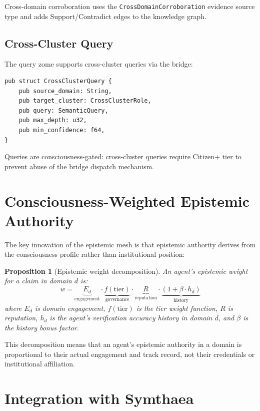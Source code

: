 \documentclass[11pt,twocolumn]{article}
\newtheorem{proposition}{Proposition}
\begin{document}
Cross-domain corroboration uses the \texttt{CrossDomainCorroboration}
evidence source type and adds Support/Contradict edges to the knowledge
graph.

\subsection{Cross-Cluster Query}

The query zome supports cross-cluster queries via the bridge:

\begin{lstlisting}
pub struct CrossClusterQuery {
    pub source_domain: String,
    pub target_cluster: CrossClusterRole,
    pub query: SemanticQuery,
    pub max_depth: u32,
    pub min_confidence: f64,
}
\end{lstlisting}

Queries are consciousness-gated: cross-cluster queries require Citizen+
tier to prevent abuse of the bridge dispatch mechanism.

\section{Consciousness-Weighted Epistemic Authority}

The key innovation of the epistemic mesh is that epistemic authority
derives from the consciousness profile rather than institutional position:

\begin{proposition}[Epistemic weight decomposition]
An agent's epistemic weight for a claim in domain $d$ is:
\begin{equation}
  w = \underbrace{E_d}_{\text{engagement}} \cdot
      \underbrace{f(\text{tier})}_{\text{governance}} \cdot
      \underbrace{R}_{\text{reputation}} \cdot
      \underbrace{(1 + \beta \cdot h_d)}_{\text{history}}
\end{equation}
where $E_d$ is domain engagement, $f(\text{tier})$ is the tier weight
function, $R$ is reputation, $h_d$ is the agent's verification accuracy
history in domain $d$, and $\beta$ is the history bonus factor.
\end{proposition}

This decomposition means that an agent's epistemic authority in a domain
is proportional to their actual engagement and track record, not their
credentials or institutional affiliation.

\section{Integration with Symthaea}
\end{document}
